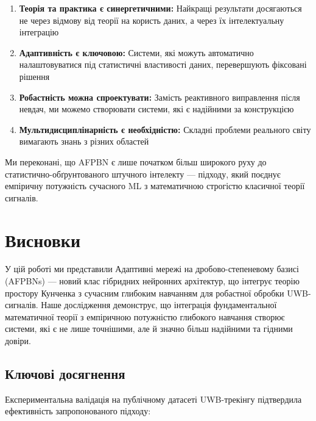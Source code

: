 \documentclass[12pt,a4paper]{article}
\begin{document}
\begin{enumerate}
	\item \textbf{Теорія та практика є синергетичними:} Найкращі результати досягаються не через відмову від теорії на користь даних, а через їх інтелектуальну інтеграцію
	
	\item \textbf{Адаптивність є ключовою:} Системи, які можуть автоматично налаштовуватися під статистичні властивості даних, перевершують фіксовані рішення
	
	\item \textbf{Робастність можна спроектувати:} Замість реактивного виправлення після невдач, ми можемо створювати системи, які є надійними за конструкцією
	
	\item \textbf{Мультидисциплінарність є необхідністю:} Складні проблеми реального світу вимагають знань з різних областей
\end{enumerate}

Ми переконані, що AFPBN є лише початком більш широкого руху до статистично-обґрунтованого штучного інтелекту --- підходу, який поєднує емпіричну потужність сучасного ML з математичною строгістю класичної теорії сигналів.

\section{Висновки}
\label{sec:conclusion}

У цій роботі ми представили Адаптивні мережі на дробово-степеневому базисі (AFPBNs) --- новий клас гібридних нейронних архітектур, що інтегрує теорію простору Кунченка з сучасним глибоким навчанням для робастної обробки UWB-сигналів. Наше дослідження демонструє, що інтеграція фундаментальної математичної теорії з емпіричною потужністю глибокого навчання створює системи, які є не лише точнішими, але й значно більш надійними та гідними довіри.

\subsection{Ключові досягнення}

Експериментальна валідація на публічному датасеті UWB-трекінгу підтвердила ефективність запропонованого підходу:
\end{document}
